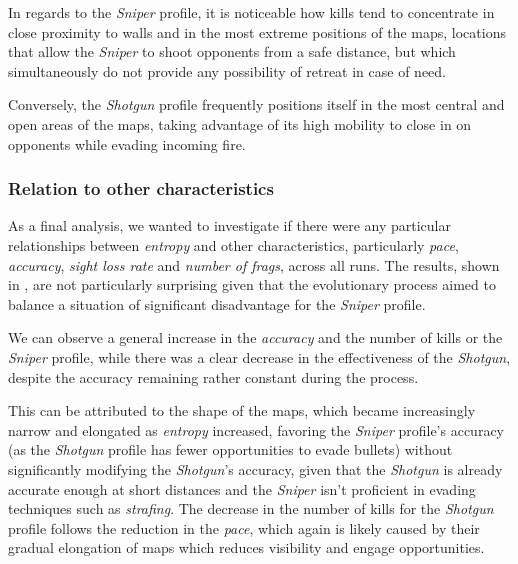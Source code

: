In regards to the \textit{Sniper} profile, it is noticeable how kills tend to concentrate in close proximity to walls and in the most extreme positions of the maps, locations that allow the \textit{Sniper} to shoot opponents from a safe distance, but which simultaneously do not provide any possibility of retreat in case of need.

Conversely, the \textit{Shotgun} profile frequently positions itself in the most central and open areas of the maps, taking advantage of its high mobility to close in on opponents while evading incoming fire.


\subsubsection{Relation to other characteristics}
As a final analysis, we wanted to investigate if there were any particular relationships between \textit{entropy} and other characteristics, particularly \textit{pace}, \textit{accuracy}, \textit{sight loss rate} and \textit{number of frags}, across all runs. The results, shown in , are not particularly surprising given that the evolutionary process aimed to balance a situation of significant disadvantage for the \textit{Sniper} profile.

We can observe a general increase in the \textit{accuracy} and the number of kills or the \textit{Sniper} profile, while there was a clear decrease in the effectiveness of the \textit{Shotgun}, despite the accuracy remaining rather constant during the process. 

This can be attributed to the shape of the maps, which became increasingly narrow and elongated as \textit{entropy} increased, favoring the \textit{Sniper} profile's accuracy (as the \textit{Shotgun} profile has fewer opportunities to evade bullets) without significantly modifying the \textit{Shotgun}'s accuracy, given that the \textit{Shotgun} is already accurate enough at short distances and the \textit{Sniper} isn't proficient in evading techniques such as \textit{strafing}. The decrease in the number of kills for the \textit{Shotgun} profile follows the reduction in the \textit{pace}, which again is likely caused by their gradual elongation of maps which reduces visibility and engage opportunities.

